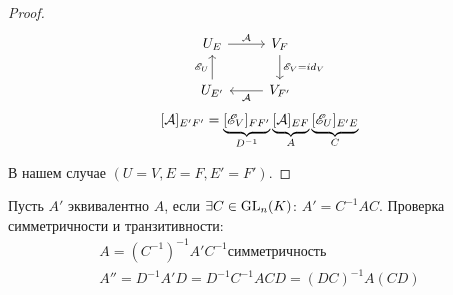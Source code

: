 \documentclass[main]{subfiles}
\begin{document}
\begin{proof}
    \[\begin{tikzcd}[ampersand replacement=\&]
            {U_E} \& {V_F} \\
            {U_{E'}} \& {V_{F'}}
            \arrow["{\mse_V=id_V}", from=1-2, to=2-2]
            \arrow["{\mca}", from=2-2, to=2-1]
            \arrow["{\mse_U}", from=2-1, to=1-1]
            \arrow["{\mca}", from=1-1, to=1-2]
        \end{tikzcd}\]
    \[[\mathcal{A}]_{E'F'}=\underbrace{[\mathscr{E}_V]_{FF'}}_{D^{-1}}\underbrace{[\mathcal{A}]_{EF}}_{A}\underbrace{[\mathscr{E}_U]_{E'E}}_{C}\]

    В нашем случае $(U=V, E=F, E'=F')$.
\end{proof}

\begin{definition} 
    Пусть $A'$ эквивалентно $A$, если $\exists C \in \operatorname{GL}_n(K)$: $A'=C^{-1}AC$.
    Проверка симметричности и транзитивности:
    \begin{gather*}
        A= (C^{-1})^{-1}A'C^{-1} симметричность \\
        A'' = D^{-1}A'D=D^{-1}C^{-1}ACD=(DC)^{-1}A(CD)  \\
    \end{gather*}
\end{definition}
\end{document}
